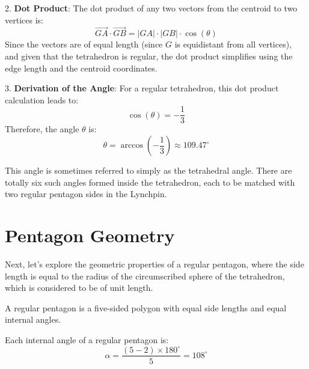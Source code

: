 \documentclass[a4paper,12pt]{article}
\begin{document}
2. \textbf{Dot Product}: The dot product of any two vectors from the centroid to two vertices is:
   \[
   \overrightarrow{GA} \cdot \overrightarrow{GB} = |GA| \cdot |GB| \cdot \cos(\theta)
   \]
   Since the vectors are of equal length (since \( G \) is equidistant from all vertices), and given that the tetrahedron is regular, the dot product simplifies using the edge length and the centroid coordinates.

3. \textbf{Derivation of the Angle}: For a regular tetrahedron, this dot product calculation leads to:
   \[
   \cos(\theta) = -\frac{1}{3}
   \]
   Therefore, the angle \(\theta\) is:
   \[
   \theta = \arccos\left(-\frac{1}{3}\right) \approx 109.47^\circ
   \]

\noindent
This angle is sometimes referred to simply as the tetrahedral angle. There are totally six such angles formed inside the tetrahedron, each to be matched with two regular pentagon sides in the Lynchpin.


\section{Pentagon Geometry}
Next, let's explore the geometric properties of a regular pentagon, where the side length is equal to the radius of the circumscribed sphere of the tetrahedron, which is considered to be of unit length.

A regular pentagon is a five-sided polygon with equal side lengths and equal internal angles.

\begin{center}
\end{center}

\noindent
Each internal angle of a regular pentagon is:
\[
\alpha = \frac{(5-2) \times 180^\circ}{5} = 108^\circ
\]
\end{document}
